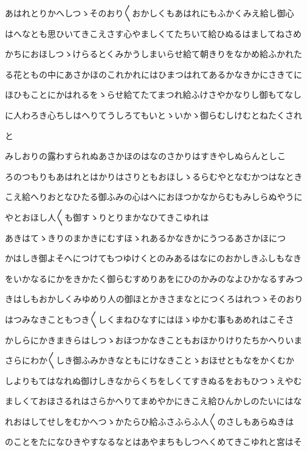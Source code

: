 \documentclass[a4paper,11pt,landscape]{ltjtarticle}
\begin{document}
\par\medskip
あはれとりかへしつゝそのおり〱おかしくもあはれにもふかくみえ給し御心
\par\medskip
はへなとも思ひいてきこえさす心やましくてたちいて給ひぬるはましてねさめ
\par\medskip
かちにおほしつゝけらるとくみかうしまいらせ給て朝きりをなかめ給ふかれた
\par\medskip
る花ともの中にあさかほのこれかれにはひまつはれてあるかなきかにさきてに
\par\medskip
ほひもことにかはれるをゝらせ給てたてまつれ給ふけさやかなりし御もてなし
\par\medskip
に人わろき心ちしはへりてうしろてもいとゝいかゝ御らむしけむとねたくされ
\par\medskip
と
\par\medskip
みしおりの露わすられぬあさかほのはなのさかりはすきやしぬらんとしこ
\par\medskip
ろのつもりもあはれとはかりはさりともおほしゝるらむやとなむかつはなとき
\par\medskip
こえ給へりおとなひたる御ふみの心はへにおほつかなからむもみしらぬやうに
\par\medskip
やとおほし人〱も御すゝりとりまかなひてきこゆれは
\par\medskip
あきはてゝきりのまかきにむすほゝれあるかなきかにうつるあさかほにつ
\par\medskip
かはしき御よそへにつけてもつゆけくとのみあるはなにのおかしきふしもなき
\par\medskip
をいかなるにかをきかたく御らむすめりあをにひのかみのなよひかなるすみつ
\par\medskip
きはしもおかしくみゆめり人の御ほとかきさまなとにつくろはれつゝそのおり
\par\medskip
はつみなきこともつき〱しくまねひなすにはほゝゆかむ事もあめれはこそさ
\par\medskip
かしらにかきまきらはしつゝおほつかなきこともおほかりけりたちかへりいま
\par\medskip
さらにわか〱しき御ふみかきなともにけなきことゝおほせともなをかくむか
\par\medskip
しよりもてはなれぬ御けしきなからくちをしくてすきぬるをおもひつゝえやむ
\par\medskip
ましくておほさるれはさらかへりてまめやかにきこえ給ひんかしのたいにはな
\par\medskip
れおはしてせしをむかへつゝかたらひ給ふさふらふ人〱のさしもあらぬきは
\par\medskip
のことをたになひきやすなるなとはあやまちもしつへくめてきこゆれと宮はそ
\end{document}
